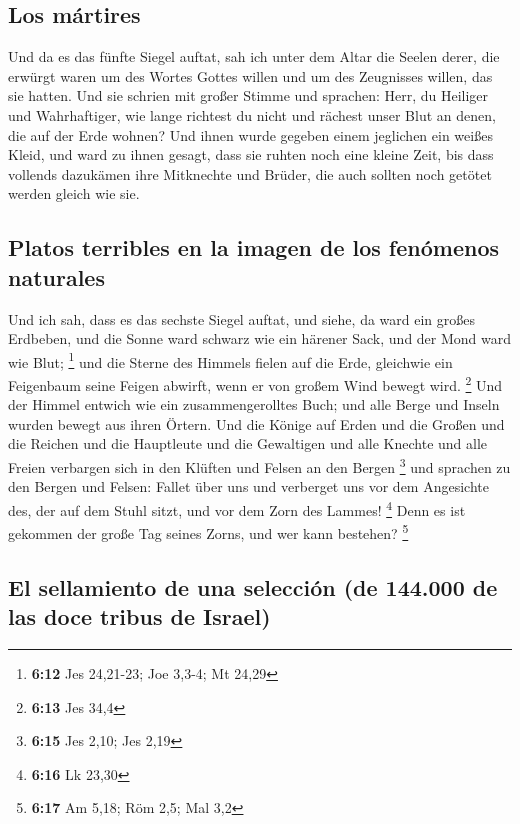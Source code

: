 \hypertarget{los-muxe1rtires}{%
\subsection{Los mártires}\label{los-muxe1rtires}}

 Und da es das fünfte Siegel auftat, sah ich unter dem
Altar die Seelen derer, die erwürgt waren um des Wortes Gottes willen
und um des Zeugnisses willen, das sie hatten.  Und sie
schrien mit großer Stimme und sprachen: Herr, du Heiliger und
Wahrhaftiger, wie lange richtest du nicht und rächest unser Blut an
denen, die auf der Erde wohnen?  Und ihnen wurde gegeben
einem jeglichen ein weißes Kleid, und ward zu ihnen gesagt, dass sie
ruhten noch eine kleine Zeit, bis dass vollends dazukämen ihre
Mitknechte und Brüder, die auch sollten noch getötet werden gleich wie
sie.

\hypertarget{platos-terribles-en-la-imagen-de-los-fenuxf3menos-naturales}{%
\subsection{Platos terribles en la imagen de los fenómenos
naturales}\label{platos-terribles-en-la-imagen-de-los-fenuxf3menos-naturales}}

 Und ich sah, dass es das sechste Siegel auftat, und
siehe, da ward ein großes Erdbeben, und die Sonne ward schwarz wie ein
härener Sack, und der Mond ward wie Blut; \footnote{\textbf{6:12} Jes
  24,21-23; Joe 3,3-4; Mt 24,29}  und die Sterne des
Himmels fielen auf die Erde, gleichwie ein Feigenbaum seine Feigen
abwirft, wenn er von großem Wind bewegt wird. \footnote{\textbf{6:13}
  Jes 34,4}  Und der Himmel entwich wie ein
zusammengerolltes Buch; und alle Berge und Inseln wurden bewegt aus
ihren Örtern.  Und die Könige auf Erden und die Großen
und die Reichen und die Hauptleute und die Gewaltigen und alle Knechte
und alle Freien verbargen sich in den Klüften und Felsen an den Bergen
\footnote{\textbf{6:15} Jes 2,10; Jes 2,19}  und sprachen
zu den Bergen und Felsen: Fallet über uns und verberget uns vor dem
Angesichte des, der auf dem Stuhl sitzt, und vor dem Zorn des Lammes!
\footnote{\textbf{6:16} Lk 23,30}  Denn es ist gekommen
der große Tag seines Zorns, und wer kann bestehen? \footnote{\textbf{6:17}
  Am 5,18; Röm 2,5; Mal 3,2}

\hypertarget{el-sellamiento-de-una-selecciuxf3n-de-144.000-de-las-doce-tribus-de-israel}{%
\subsection{El sellamiento de una selección (de 144.000 de las doce
tribus de
Israel)}\label{el-sellamiento-de-una-selecciuxf3n-de-144.000-de-las-doce-tribus-de-israel}}

